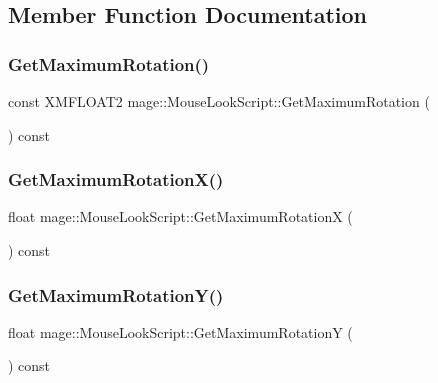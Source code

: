 \subsection{Member Function Documentation}
\hypertarget{classmage_1_1_mouse_look_script_a644a7b52eccd338aaa141e8a1016c4e2}{}\label{classmage_1_1_mouse_look_script_a644a7b52eccd338aaa141e8a1016c4e2} 
\subsubsection{\texorpdfstring{Get\+Maximum\+Rotation()}{GetMaximumRotation()}}
{\footnotesize\ttfamily const X\+M\+F\+L\+O\+A\+T2 mage\+::\+Mouse\+Look\+Script\+::\+Get\+Maximum\+Rotation (\begin{DoxyParamCaption}{ }\end{DoxyParamCaption}) const}

\hypertarget{classmage_1_1_mouse_look_script_a07b026b6cb84edfacba8c05dc550da80}{}\label{classmage_1_1_mouse_look_script_a07b026b6cb84edfacba8c05dc550da80} 
\subsubsection{\texorpdfstring{Get\+Maximum\+Rotation\+X()}{GetMaximumRotationX()}}
{\footnotesize\ttfamily float mage\+::\+Mouse\+Look\+Script\+::\+Get\+Maximum\+RotationX (\begin{DoxyParamCaption}{ }\end{DoxyParamCaption}) const}

\hypertarget{classmage_1_1_mouse_look_script_a9d7ac7941846f4c47d65718faabf6dad}{}\label{classmage_1_1_mouse_look_script_a9d7ac7941846f4c47d65718faabf6dad} 
\subsubsection{\texorpdfstring{Get\+Maximum\+Rotation\+Y()}{GetMaximumRotationY()}}
{\footnotesize\ttfamily float mage\+::\+Mouse\+Look\+Script\+::\+Get\+Maximum\+RotationY (\begin{DoxyParamCaption}{ }\end{DoxyParamCaption}) const}


